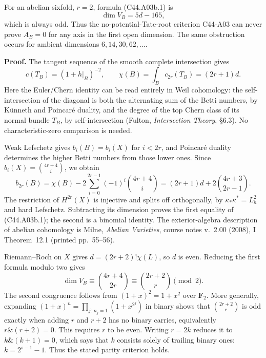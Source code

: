 \documentclass[11pt]{article}
\theoremstyle{remark}\newtheorem{remark}[theorem]{Remark}
\begin{document}
For an abelian sixfold, $r=2$, formula (C44.A03b.1) is
\[
                  \dim V_B=5d-165,
\]
which is always odd. Thus the no-potential-Tate-root criterion
C44-A03 can never prove $A_B=0$ for any axis in the first open
dimension. The same obstruction occurs for ambient dimensions
$6,14,30,62,\ldots$.

\textbf{Proof.}
The tangent sequence of the smooth complete intersection gives
\[
 c(T_B)=(1+h|_B)^{-2},\qquad
 \chi(B)=\int_Bc_{2r}(T_B)=(2r+1)d.
\]
Here the Euler/Chern identity can be read entirely in Weil
cohomology: the self-intersection of the diagonal is both the
alternating sum of the Betti numbers, by K\"unneth and Poincar\'e
duality, and the degree of the top Chern class of its normal
bundle $T_B$, by self-intersection (Fulton, \emph{Intersection
Theory}, \S6.3). No characteristic-zero comparison is needed.

Weak Lefschetz gives $b_i(B)=b_i(X)$ for $i<2r$, and Poincar\'e
duality determines the higher Betti numbers from those lower
ones. Since $b_i(X)=\binom{4r+4}{i}$, we obtain
\[
 b_{2r}(B)
 =\chi(B)-2\sum_{i=0}^{2r-1}(-1)^i\binom{4r+4}{i}
 =(2r+1)d+2\binom{4r+3}{2r-1}.
\]
The restriction of $H^{2r}(X)$ is injective and splits off
orthogonally, by $\kappa_*\kappa^*=L_h^2$ and hard Lefschetz.
Subtracting its dimension proves the first equality of
(C44.A03b.1); the second is a binomial identity.
The exterior-algebra description of abelian cohomology is
Milne, \emph{Abelian Varieties}, course notes v.~2.00 (2008),
I Theorem~12.1 (printed pp.~55--56).

Riemann--Roch on $X$ gives $d=(2r+2)!\chi(L)$, so $d$ is even.
Reducing the first formula modulo two gives
\[
 \dim V_B\equiv\binom{4r+4}{2r}
                 \equiv\binom{2r+2}{r}\pmod2.
\]
The second congruence follows from $(1+x)^2=1+x^2$ over
$\mathbf F_2$. More generally, expanding
$(1+x)^n=\prod_{j:\,n_j=1}(1+x^{2^j})$ in binary shows that
$\binom{2r+2}{r}$ is odd exactly when adding $r$ and $r+2$
has no binary carries, equivalently $r\mathbin{\&}(r+2)=0$.
This requires $r$ to be even. Writing $r=2k$ reduces it to
$k\mathbin{\&}(k+1)=0$, which says that $k$ consists solely
of trailing binary ones: $k=2^{s-1}-1$.
Thus the stated parity criterion holds.
\end{document}
